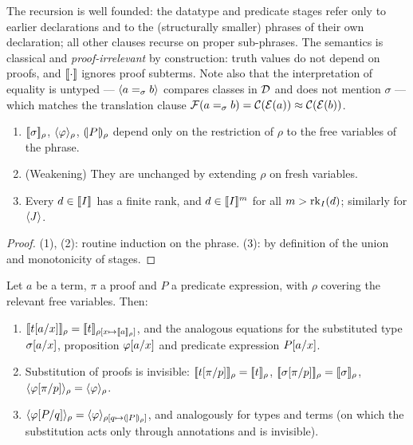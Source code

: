 The recursion is well founded: the datatype and predicate stages refer
only to earlier declarations and to the (structurally smaller) phrases of
their own declaration; all other clauses recurse on proper sub-phrases.
The semantics is classical and \emph{proof-irrelevant} by construction:
truth values do not depend on proofs, and $[\![ \cdot ]\!]$ ignores proof
subterms.  Note also that the interpretation of equality is untyped ---
$\langle a =_\sigma b \rangle$ compares classes in $\mathcal{D}$ and does not mention
$\sigma$ --- which matches the translation clause $\mathcal{F}(a =_\sigma b) =
\mathcal{C}(\mathcal{E}(a)) \approx \mathcal{C}(\mathcal{E}(b))$.

\begin{lemma}
\label{lem:sem-basic}
\begin{enumerate}[leftmargin=2em]
\item $[\![ \sigma ]\!]_{\rho}$, $\langle \varphi \rangle_{\rho}$, $(\!| P |\!)_{\rho}$
  depend only on the restriction of $\rho$ to the free variables of the
  phrase.
\item (Weakening) They are unchanged by extending $\rho$ on fresh
  variables.
\item Every $d \in [\![ I ]\!]_{}$ has a finite rank, and
  $d \in [\![ I ]\!]^{m}$ for all $m > \mathrm{rk}_{I}(d)$; similarly for
  $\langle J \rangle$.
\end{enumerate}
\end{lemma}

\begin{proof}
(1), (2): routine induction on the phrase.  (3): by definition of the
union and monotonicity of stages.
\end{proof}

\begin{lemma}
\label{lem:sem-subst}
Let $a$ be a term, $\pi$ a proof and $P$ a predicate expression, with
$\rho$ covering the relevant free variables.  Then:
\begin{enumerate}[leftmargin=2em]
\item $[\![ t[a/x] ]\!]_\rho = [\![ t ]\!]_{\rho[x \mapsto
  [\![ a ]\!]_\rho]}$, and the analogous equations for the substituted
  type $\sigma[a/x]$, proposition $\varphi[a/x]$ and
  predicate expression $P[a/x]$.
\item Substitution of proofs is invisible:
  $[\![ t[\pi/p] ]\!]_\rho = [\![ t ]\!]_\rho$,
  $[\![ \sigma[\pi/p] ]\!]_{\rho} = [\![ \sigma ]\!]_{\rho}$,
  $\langle \varphi[\pi/p] \rangle_{\rho} = \langle \varphi \rangle_{\rho}$.
\item $\langle \varphi[P/q] \rangle_{\rho} = \langle \varphi \rangle_{\rho[q \mapsto
  (\!| P |\!)_{\rho}]}$, and analogously for types and terms (on which the
  substitution acts only through annotations and is invisible).
\end{enumerate}
\end{lemma}

